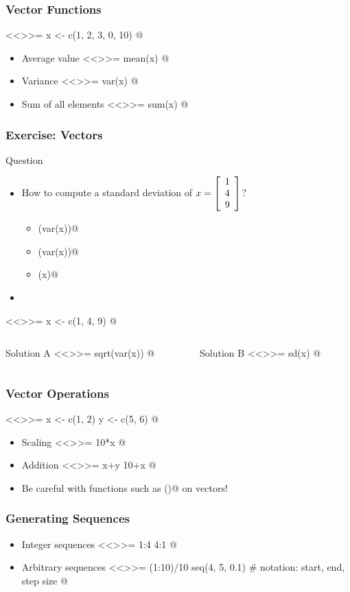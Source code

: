 \documentclass[%
  final,
  11pt, 
  show notes, %
  t, %
  fleqn, %
]{beamer}
\begin{document}
\begin{frame}[fragile]
  \frametitle{Vector Functions}
<<>>=
x <- c(1, 2, 3, 0, 10)
@
\begin{itemize}
\item Average value
<<>>=
mean(x)
@
\item Variance
<<>>=
var(x)
@
\item Sum of all elements
<<>>=
sum(x)
@
\end{itemize}
\end{frame}

\begin{frame}[fragile]
  \frametitle{Exercise: Vectors}
\vfill
\begin{exampleblock}{Question}
\begin{itemize}
\item How to compute a standard deviation of $x = \left[\begin{array}{c} 1 \\ 4 \\ 9 \end{array} \right]$?
\begin{itemize}
\item \verb@sqr(var(x))@
\item \verb@sqrt(var(x))@
\item \verb@sd(x)@
\end{itemize}
\item \CourseQuiz
\end{itemize}
\end{exampleblock}
\ifQuizSolution
<<>>=
x <- c(1, 4, 9)
@
\pause
\begin{columns}[c]
\begin{column}{.45\textwidth}
Solution A
<<>>=
sqrt(var(x))
@
\end{column}
\begin{column}{.45\textwidth}
Solution B
<<>>=
sd(x)
@
\end{column}
\end{columns}
\fi
\vfill
\end{frame}

\begin{frame}[fragile]
  \frametitle{Vector Operations}
<<>>=
x <- c(1, 2)
y <- c(5, 6)
@
\begin{itemize}
\item Scaling
<<>>=
10*x
@
\item Addition
<<>>=
x+y
10+x
@
\item Be careful with functions such as \verb@sin()@ on vectors!
\end{itemize}
\end{frame}

\begin{frame}[fragile]
  \frametitle{Generating Sequences}
\begin{itemize}
\item Integer sequences
<<>>=
1:4
4:1
@
\item Arbitrary sequences
<<>>=
(1:10)/10
seq(4, 5, 0.1) # notation: start, end, step size
@
\end{itemize}
\end{frame}
\end{document}
